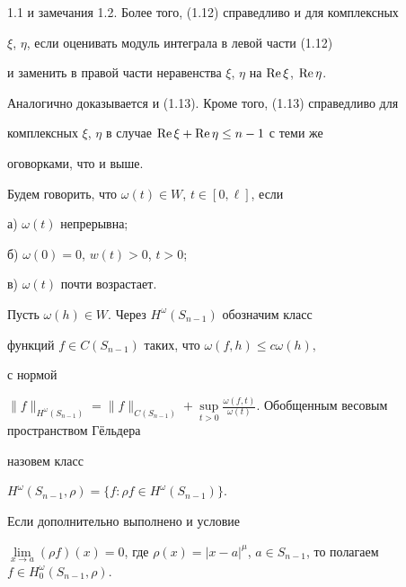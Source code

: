 1.1 и замечания 1.2. Более того, (1.12) справедливо и для комплексных


$\xi$, $\eta$, если оценивать модуль интеграла в левой части (1.12)


и заменить в правой части неравенства $\xi$, $\eta$ на $\operatorname{Re}\xi$, $\operatorname{Re}\eta$.


Аналогично доказывается и (1.13). Кроме того, (1.13) справедливо для


комплексных $\xi$, $\eta$ в случае $\operatorname{Re}\xi+\operatorname{Re}\eta\le n-1$ с теми же


оговорками, что и выше.





\begin{defns}


Будем говорить, что $\omega(t) \in W$, $t\in [0,\ell]$, если





а) $\omega(t)$ непрерывна;





б) $\omega(0) = 0$, $w(t) > 0$, $t>0$;





в) $\omega(t)$ почти возрастает.


\end{defns}





\begin{defns}


Пусть $\omega(h)\in W$. Через $H^\omega(S_{n-1})$ обозначим класс


функций $f \in C(S_{n-1})$ таких, что $\omega(f,h) \le c \omega(h),$


с нормой


$\|f\|_{H^\omega(S_{n-1})} = \|f\|_{C(S_{n-1})} + \sup\limits_{t>0}


\frac{\omega (f,t)}{\omega(t)}$. Обобщенным весовым пространством Г\"ельдера


назовем класс


$H^\omega(S_{n-1},\rho) = \{f: \rho f\in H^\omega(S_{n-1})\}$.


Если дополнительно выполнено и условие


$\lim \limits_{x\to a} (\rho f)(x) = 0$, где $\rho(x) = |x-a|^\mu$, $a \in


S_{n-1}$, то полагаем $f\in H_0^\omega(S_{n-1}, \rho)$.


\end{defns}





